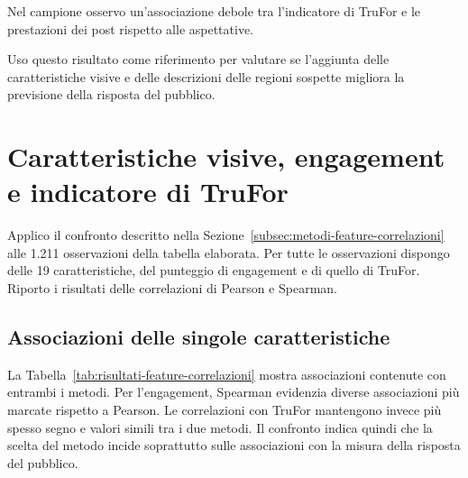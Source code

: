 Nel campione osservo un'associazione debole tra l’indicatore di TruFor e le prestazioni dei post rispetto alle aspettative.

Uso questo risultato come riferimento per valutare se l'aggiunta delle caratteristiche visive e delle descrizioni delle regioni sospette migliora la previsione della risposta del pubblico.

\section{Caratteristiche visive, engagement e indicatore di TruFor}
\label{sec:risultati-feature-visive}

Applico il confronto descritto nella Sezione~\ref{subsec:metodi-feature-correlazioni} alle 1.211 osservazioni della tabella elaborata. Per tutte le osservazioni dispongo delle 19 caratteristiche, del punteggio di engagement e di quello di TruFor. Riporto i risultati delle correlazioni di Pearson e Spearman.

\subsection{Associazioni delle singole caratteristiche}

La Tabella~\ref{tab:risultati-feature-correlazioni} mostra associazioni contenute con entrambi i metodi. Per l’engagement, Spearman evidenzia diverse associazioni più marcate rispetto a Pearson. Le correlazioni con TruFor mantengono invece più spesso segno e valori simili tra i due metodi. Il confronto indica quindi che la scelta del metodo incide soprattutto sulle associazioni con la misura della risposta del pubblico.

